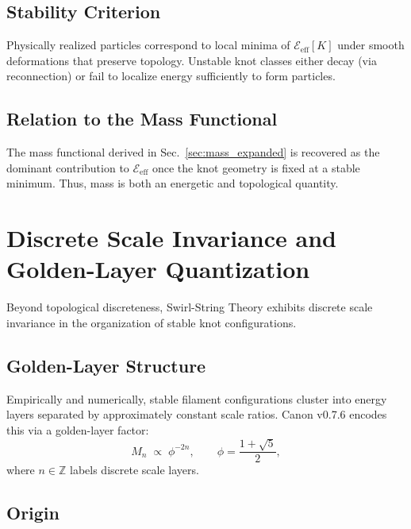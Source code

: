 \documentclass[10pt]{article}
\begin{document}
\subsection{Stability Criterion}

Physically realized particles correspond to local minima of
$\mathcal{E}_{\mathrm{eff}}[K]$ under smooth deformations that preserve topology.
Unstable knot classes either decay (via reconnection) or fail to localize
energy sufficiently to form particles.

\subsection{Relation to the Mass Functional}

The mass functional derived in Sec.~\ref{sec:mass_expanded} is recovered as the
dominant contribution to $\mathcal{E}_{\mathrm{eff}}$ once the knot geometry
is fixed at a stable minimum. Thus, mass is both an energetic and topological
quantity.

    \section{Discrete Scale Invariance and Golden-Layer Quantization}
    \label{sec:golden}

Beyond topological discreteness, Swirl-String Theory exhibits discrete
scale invariance in the organization of stable knot configurations.

\subsection{Golden-Layer Structure}

Empirically and numerically, stable filament configurations cluster into
energy layers separated by approximately constant scale ratios.
Canon v0.7.6 encodes this via a golden-layer factor:
\begin{equation}
    M_n \;\propto\; \phi^{-2n}, \qquad \phi=\frac{1+\sqrt{5}}{2},
\end{equation}
where $n\in\mathbb{Z}$ labels discrete scale layers.

\subsection{Origin}
\end{document}
